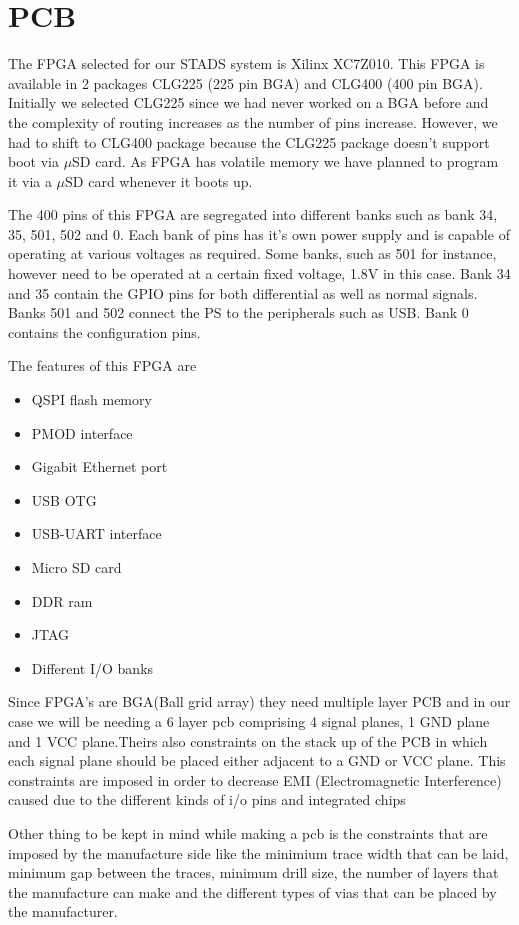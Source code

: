 \documentclass[../../main.tex]{subfiles}
\begin{document}
\section{PCB}
\thispagestyle{fancy}

The FPGA selected for our STADS system is Xilinx XC7Z010. This FPGA is available in 2 packages CLG225 (225 pin BGA) and CLG400 (400 pin BGA). Initially we selected CLG225 since we had never worked on a BGA before and the complexity of routing increases as the number of pins increase. However, we had to shift to CLG400 package because the CLG225 package doesn't support boot via $\mu$SD card.  As FPGA has volatile memory we have planned to program it via a $\mu$SD card whenever it boots up.

The 400 pins of this FPGA are segregated into different banks such as bank 34, 35, 501, 502 and 0. Each bank of pins has it's own power supply and is capable of operating at various voltages as required. Some banks, such as 501 for instance, however need to be operated at a certain fixed voltage, 1.8V in this case. Bank 34 and 35 contain the GPIO pins for both differential as well as normal signals. Banks 501 and 502 connect the PS to the peripherals such as USB. Bank 0 contains the configuration pins.

The features of this FPGA are
\begin{itemize}
    \item {QSPI flash memory }
    \item {PMOD interface}
    \item {Gigabit Ethernet port}
    \item {USB OTG}
    \item {USB-UART interface}
    \item {Micro SD card}
    \item {DDR ram}
    \item {JTAG}
    \item {Different I/O banks}
\end{itemize}

Since FPGA's are BGA(Ball grid array) they need multiple layer PCB and in our case we will be needing a 6 layer pcb comprising 4 signal planes, 1 GND plane and 1 VCC plane.Theirs also constraints on the stack up of the PCB in which each signal plane should be placed either adjacent to a GND or VCC plane. This constraints are imposed in order to decrease EMI (Electromagnetic Interference) caused due to the different kinds of i/o pins and integrated chips

Other thing to be kept in mind while making a pcb is the constraints that are imposed by the manufacture side like the minimium trace width that can be laid, minimum gap between the traces, minimum drill size, the number of layers that the manufacture can make and the different types of vias that can be placed by the manufacturer.
\end{document}
